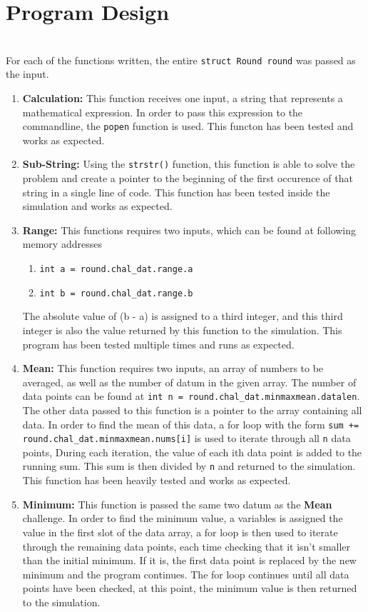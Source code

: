 \documentclass[11pt]{report}
\newcommand{\code}[1]{\colorbox{light-gray}{\texttt{#1}}}
\begin{document}
\section{Program Design}
\\ For each of the functions written, the entire \code{struct Round round} was passed as the input.
\begin{enumerate}
    \item \textbf{Calculation:} This function receives one input, a string that represents a mathematical expression. In order to pass this expression to the commandline, the \code{popen} function is used. This functon has been tested and works as expected.
    \item \textbf{Sub-String:} Using the \code{strstr()} function, this function is able to solve the problem and create a pointer to the beginning of the first occurence of that string in a single line of code. This function has been tested inside the simulation and works as expected.
    \item \textbf{Range:} This functions requires two inputs, which can be found at  following memory addresses \begin{enumerate}
        \item \code{int a = round.chal\_dat.range.a}
        \item \code{int b = round.chal\_dat.range.b}
    \end{enumerate}
    The absolute value of (b - a) is assigned to a third integer, and this third integer is also the value returned by this function to the simulation. This program has been tested multiple times and runs as expected.
    \item \textbf{Mean:} This function requires two inputs, an array of numbers to be averaged, as well as the number of datum in the given array. The number of data points can be found at \code{int n = round.chal\_dat.minmaxmean.datalen}. The other data passed to this function is a pointer to the array containing all data. In order to find the mean of this data, a for loop with the form \code{sum += round.chal\_dat.minmaxmean.nums[i]} is used to iterate through all \code{n} data points, During each iteration, the value of each ith data point is added to the running sum. This sum is then divided by \code{n} and returned to the simulation. This function has been heavily tested and works as expected.
    \item \textbf{Minimum:} This function is passed the same two datum as the \textbf{Mean} challenge. In order to find the minimum value, a variables is assigned the value in the first slot of the data array, a for loop is then used to iterate through the remaining data points, each time checking that it isn't smaller than the initial minimum. If it is, the first data point is replaced by the new minimum and the program continues. The for loop continues until all data points have been checked, at this point, the minimum value is then returned to the simulation.

\end{enumerate}
\end{document}
